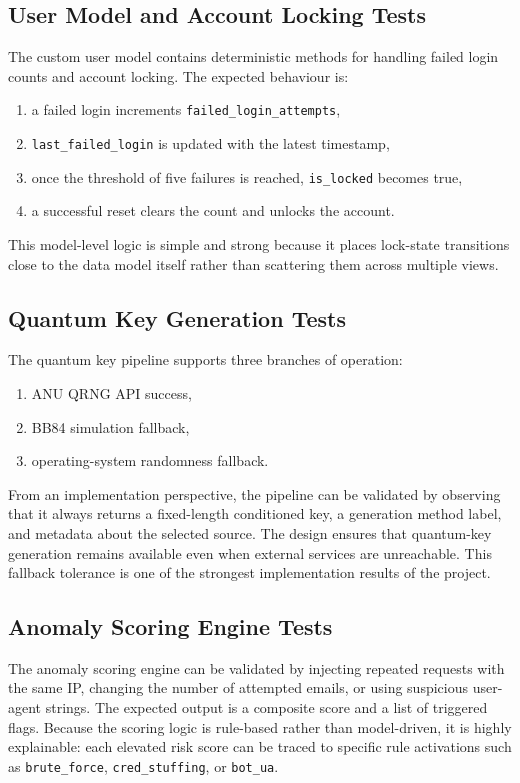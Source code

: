 \subsection{User Model and Account Locking Tests}
The custom user model contains deterministic methods for handling failed login counts and account locking. The expected behaviour is:

\begin{enumerate}
    \item a failed login increments \texttt{failed\_login\_attempts},
    \item \texttt{last\_failed\_login} is updated with the latest timestamp,
    \item once the threshold of five failures is reached, \texttt{is\_locked} becomes true,
    \item a successful reset clears the count and unlocks the account.
\end{enumerate}

This model-level logic is simple and strong because it places lock-state transitions close to the data model itself rather than scattering them across multiple views.

\subsection{Quantum Key Generation Tests}
The quantum key pipeline supports three branches of operation:

\begin{enumerate}
    \item ANU QRNG API success,
    \item BB84 simulation fallback,
    \item operating-system randomness fallback.
\end{enumerate}

From an implementation perspective, the pipeline can be validated by observing that it always returns a fixed-length conditioned key, a generation method label, and metadata about the selected source. The design ensures that quantum-key generation remains available even when external services are unreachable. This fallback tolerance is one of the strongest implementation results of the project.

\subsection{Anomaly Scoring Engine Tests}
The anomaly scoring engine can be validated by injecting repeated requests with the same IP, changing the number of attempted emails, or using suspicious user-agent strings. The expected output is a composite score and a list of triggered flags. Because the scoring logic is rule-based rather than model-driven, it is highly explainable: each elevated risk score can be traced to specific rule activations such as \texttt{brute\_force}, \texttt{cred\_stuffing}, or \texttt{bot\_ua}.

